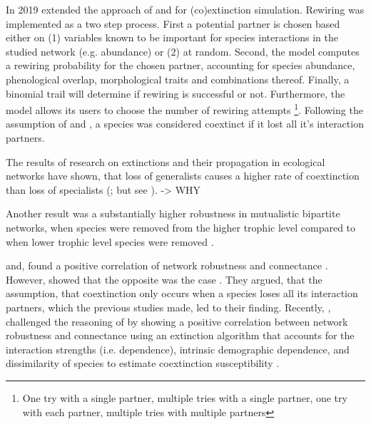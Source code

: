 \documentclass[12pt,a4paper]{article}
\begin{document}
In 2019 \citeauthor{Vizentin-Bugoni2019} extended the approach of \citeauthor{Memmott2004} and \citeauthor{Dunne2002} \parencite{Memmott2004, Dunne2002} for (co)extinction simulation.
Rewiring was implemented as a two step process. First a potential partner is chosen based either on (1) variables known to be important for species interactions in the studied network (e.g. abundance) or (2) at random. Second, the model computes a rewiring probability for the chosen partner, accounting for species abundance, phenological overlap, morphological traits and combinations thereof. Finally, a binomial trail will determine if rewiring is successful or not. Furthermore, the model allows its users to choose the number of rewiring attempts \footnote{
One try with a single partner, 
multiple tries with a single partner, 
one try with each partner, 
multiple tries with multiple partners
}. Following the assumption of \citeauthor{Memmott2004} and \citeauthor{Dunne2002}, a species was considered coextinct if it lost all it's interaction partners.
\par


The results of research on extinctions and their propagation in ecological networks have shown, that loss of generalists causes a higher rate of coextinction than loss of specialists (\cite{Memmott2004, Kaiser-Bunbury2010, Traveset2017, Bastazini2018, Vizentin-Bugoni2019, Biella2020}; but see \cite{Dunne2002}). 
-> WHY

Another result was a substantially higher robustness in mutualistic bipartite networks, when species were removed from the higher trophic level compared to when lower trophic level species were removed \parencite{Schleuning2016}.


\citeauthor{Dunne2002, Ekloef2006} and, \citeauthor{Thebault2010} found a positive correlation of network robustness and connectance \parencite{Dunne2002, Ekloef2006, Thebault2010}. However, \citeauthor{Vieira2015} showed that the opposite was the case \parencite{Vieira2015}. They argued, that the assumption, that coextinction only occurs when a species loses all its interaction partners, which the previous studies made, led to their finding. Recently, \citeauthor{Baumgartner2020}, challenged the reasoning of \citeauthor{Vieira2015} by showing a positive correlation between network robustness and connectance using an extinction algorithm that accounts for the interaction strengths (i.e. dependence), intrinsic demographic dependence, and dissimilarity of species to estimate coextinction susceptibility \parencite{Baumgartner2020}. 
\end{document}
